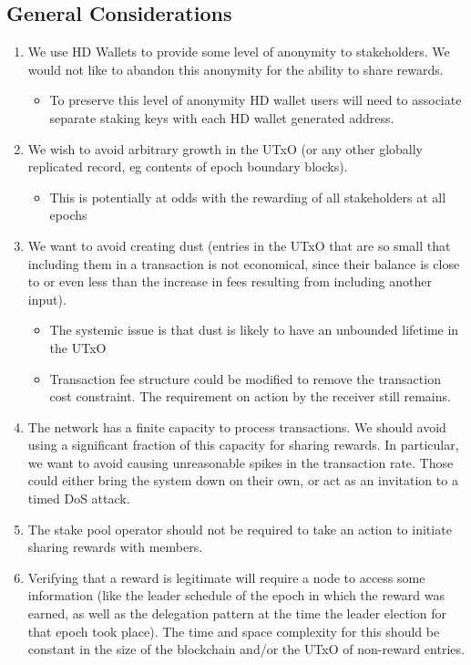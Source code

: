 \documentclass[11pt,a4paper]{article}
\begin{document}
\subsection{General Considerations}
\label{general-considerations}

\begin{enumerate}
\item
  We use HD Wallets to provide some level of anonymity to stakeholders.
  We would not like to abandon this anonymity for the ability to share
  rewards.

  \begin{itemize}
  \item
    To preserve this level of anonymity HD wallet users will need to
    associate separate staking keys with each HD wallet generated
    address.
  \end{itemize}
\item
  We wish to avoid arbitrary growth in the UTxO (or any other globally
  replicated record, eg contents of epoch boundary blocks).

  \begin{itemize}
  \item
    This is potentially at odds with the rewarding of all stakeholders
    at all epochs
  \end{itemize}
\item
  We want to avoid creating dust (entries in the UTxO that are so small
  that including them in a transaction is not economical, since their
  balance is close to or even less than the increase in fees resulting
  from including another input).

  \begin{itemize}
  \item
    The systemic issue is that dust is likely to have an unbounded
    lifetime in the UTxO
  \item
    Transaction fee structure could be modified to remove the
    transaction cost constraint. The requirement on action by the
    receiver still remains.
  \end{itemize}
\item
  The network has a finite capacity to process transactions. We should
  avoid using a significant fraction of this capacity for sharing
  rewards. In particular, we want to avoid causing unreasonable spikes
  in the transaction rate. Those could either bring the system down on
  their own, or act as an invitation to a timed DoS attack.
\item
  The stake pool operator should not be required to take an action to
  initiate sharing rewards with members.
\item
  Verifying that a reward is legitimate will require a node to access
  some information (like the leader schedule of the epoch in which the
  reward was earned, as well as the delegation pattern at the time the
  leader election for that epoch took place). The time and space
  complexity for this should be constant in the size of the blockchain
  and/or the UTxO of non-reward entries.
\end{enumerate}
\end{document}
